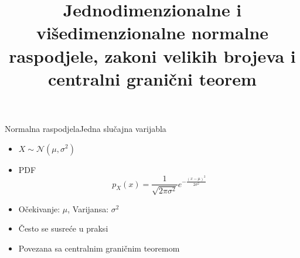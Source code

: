 \documentclass[aspectratio=169]{beamer}
\title {
  Jednodimenzionalne i višedimenzionalne normalne raspodjele, zakoni velikih
  brojeva i centralni granični teorem
}
\date{}
\begin{document}
  \begin{frame}
    \maketitle
  \end{frame}

{

	 {
	}

  \begin{frame}{Normalna raspodjela}{Jedna slučajna varijabla}
    \begin{itemize}
      \item $X \sim \mathcal{N}(\mu,\sigma^2)$
      \item PDF
        $$p_X(x) = \frac{1}{\sqrt{2\pi\sigma^2}} e^{-\frac{(x-\mu)^2}{2\sigma^2}}$$
      \item Očekivanje: $\mu$, Varijansa: $\sigma^2$
      \item Često se susreće u praksi
      \item Povezana sa centralnim graničnim teoremom
    \end{itemize}
  \end{frame}

}
\end{document}
